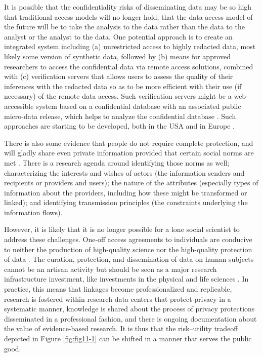 \documentclass[]{krantz}
\begin{document}
It is possible that the confidentiality risks of disseminating data may
be so high that traditional access models will no longer hold; that the
data access model of the future will be to take the analysis to the data
rather than the data to the analyst or the analyst to the data. One
potential approach is to create an integrated system including (a)
unrestricted access to highly redacted data, most likely some version of
synthetic data, followed by (b) means for approved researchers to access
the confidential data via remote access solutions, combined with (c)
verification servers that allows users to assess the quality of their
inferences with the redacted data so as to be more efficient with their
use (if necessary) of the remote data access. Such verification servers
might be a web-accessible system based on a confidential database with
an associated public micro-data release, which helps to analyze the
confidential database \citep{karr2014analytical}. Such approaches are
starting to be developed, both in the USA and in Europe
\citep{Elias2014, jones2006administrative}.

There is also some evidence that people do not require complete
protection, and will gladly share even private information provided that
certain social norms are met \citep{Wilbanks2014, Pentland2014}. There
is a research agenda around identifying those norms as well;
characterizing the interests and wishes of actors (the information
senders and recipients or providers and users); the nature of the
attributes (especially types of information about the providers,
including how these might be transformed or linked); and identifying
transmission principles (the constraints underlying the information
flows).

However, it is likely that it is no longer possible for a lone social
scientist to address these challenges. One-off access agreements to
individuals are conducive to neither the production of high-quality
science nor the high-quality protection of data
\citep{schermann2014big}. The curation, protection, and dissemination of
data on human subjects cannot be an artisan activity but should be seen
as a major research infrastructure investment, like investments in the
physical and life sciences
\citep{bird2011computing, abazajian2009seventh, human2010catalog}. In
practice, this means that linkages become professionalized and
replicable, research is fostered within research data centers that
protect privacy in a systematic manner, knowledge is shared about the
process of privacy protections disseminated in a professional fashion,
and there is ongoing documentation about the value of evidence-based
research. It is thus that the risk--utility tradeoff depicted in Figure
\ref{fig:fig11-1} can be shifted in a manner that serves the public
good.
\end{document}
